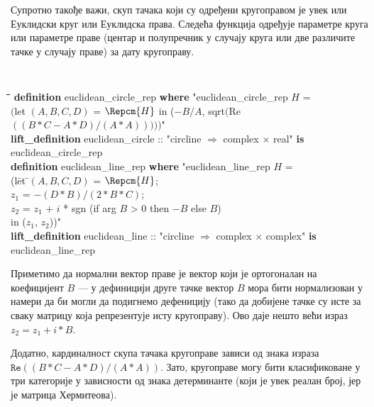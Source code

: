 Супротно такође важи, скуп тачака који су одређени кругоправом је увек
или Еуклидски круг или Еуклидска права. Следећа функција одређује
параметре круга или параметре праве (центар и полупречник у случају
круга или две различите тачке у случају праве) за дату кругоправу.
{\tt
  \begin{tabbing}
    \hspace{5mm}\=\hspace{5mm}\=\hspace{5mm}\=\hspace{5mm}\=\hspace{5mm}\=\kill
{\bf definition} euclidean\_circle\_rep {\bf where} "euclidean\_circle\_rep $H$ = \\
\> $($let $(A, B, C, D)$ = $\Repcm{H}$ in ($-B/A$, sqrt$($Re $((B*C - A*D)/(A*A))))$$)$"\\
{\bf lift\_definition} euclidean\_circle :: "circline $\Rightarrow$ complex $\times$ real" {\bf is}\\
\> euclidean\_circle\_rep\\
{\bf definition} euclidean\_line\_rep {\bf where} "euclidean\_line\_rep $H$ = \\
\>(l\=et \=$(A, B, C, D)$ = $\Repcm{H}$; \\
\>\>\>$z_1$ = $-(D*B)/(2*B*C)$;\\
\>\>\>$z_2$ = $z_1$ + $i$ * sgn (if arg $B$ > 0 then $-B$ else $B$)\\
\>\>in ($z_1$, $z_2$))"\\
{\bf lift\_definition} euclidean\_line :: "circline $\Rightarrow$ complex $\times$ complex" {\bf is}\\
\> euclidean\_line\_rep
  \end{tabbing}
}
\noindent Приметимо да нормални вектор праве је вектор који је
ортогоналан на коефицијент $B$ --- у дефиницији друге тачке вектор $B$
мора бити нормализован у намери да би могли да подигнемо дефеницију
(тако да добијене тачке су исте за сваку матрицу која репрезентује
исту кругоправу). Ово даје нешто већи израз $z_2=z_1+i*B$.

Додатно, кардиналност скупа тачака кругоправе зависи од знака израза
$\mathtt{Re} ((B*C - A*D)/(A*A))$. Зато, кругоправе могу бити
класификоване у три категорије у зависности од знака детерминанте
(који је увек реалан број, јер је матрица Хермитеова).

